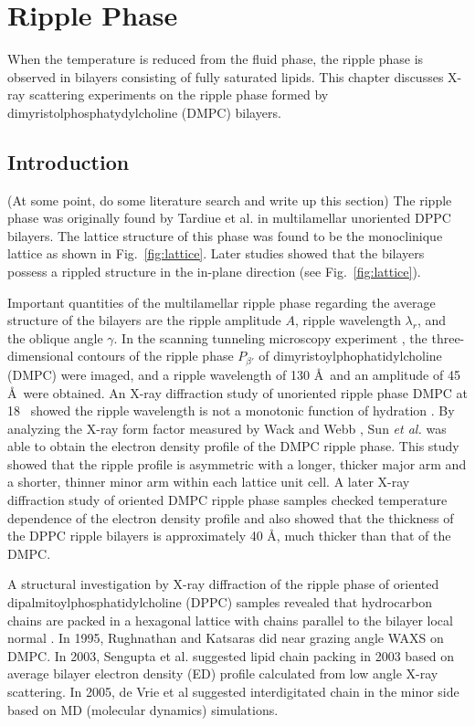 \chapter{Ripple Phase}
When the temperature is reduced from the fluid phase, 
the ripple phase is observed in bilayers consisting of fully saturated lipids.
This chapter discusses X-ray scattering experiments on the ripple phase 
formed by dimyristolphosphatydylcholine (DMPC) bilayers. 

\section{Introduction}
(At some point, do some literature search and write up this section)
The ripple phase was originally found by Tardiue et al. in multilamellar
unoriented DPPC bilayers. The lattice structure of this phase was found
to be the monoclinique lattice as shown in Fig.~\ref{fig:lattice}. 
Later studies showed that the bilayers possess a rippled structure
in the in-plane direction (see Fig.~\ref{fig:lattice}).

Important quantities of the multilamellar ripple phase regarding the average
structure of the bilayers are the ripple amplitude $A$,
ripple wavelength $\lambda_r$, and the oblique angle $\gamma$. 
In the scanning tunneling microscopy experiment \cite{ref:Zasadzinski88}, 
the three-dimensional contours of the ripple phase $P_{\beta'}$ of
dimyristoylphophatidylcholine (DMPC) were imaged, and
a ripple wavelength of 130 \AA\ and an amplitude of 45 \AA\ were obtained.
An X-ray diffraction study of unoriented ripple phase DMPC at 18 \textcelsius\
showed the ripple wavelength is not a monotonic function of hydration
\cite{ref:Wack89}. By analyzing the X-ray form factor measured by Wack
and Webb \cite{ref:Wack89}, Sun \textit{et al.} \cite{ref:Sun96} was able to
obtain the electron density profile of the DMPC ripple phase. This
study showed that the ripple profile is asymmetric with a longer, thicker
major arm and a shorter, thinner minor arm within each lattice unit cell.  
A later X-ray diffraction study of oriented DMPC ripple phase samples
\cite{ref:Sengupta03}
checked temperature dependence of the electron density profile and also
showed that the thickness of the DPPC ripple bilayers is approximately
40 \AA, much thicker than that of the DMPC.

A structural investigation by X-ray diffraction of the ripple phase of
oriented dipalmitoylphosphatidylcholine (DPPC) samples revealed that
hydrocarbon chains are packed in a hexagonal lattice with chains
parallel to the bilayer local normal \cite{ref:Hentschel91}.
In 1995, Rughnathan and Katsaras did near grazing angle WAXS on DMPC.
In 2003, Sengupta et al. suggested lipid chain packing in 2003 based on 
average bilayer electron density (ED) profile calculated from low angle
X-ray scattering. In 2005, de Vrie et al suggested interdigitated chain in the
minor side based on MD (molecular dynamics) simulations.

